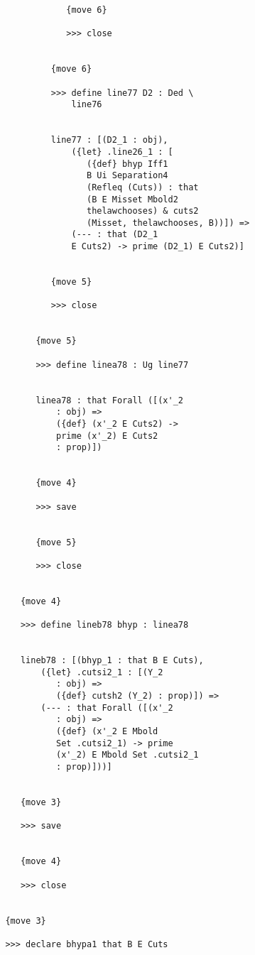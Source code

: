 \documentclass[12pt]{article}
\begin{document}
\begin{verbatim}
                     {move 6}

                     >>> close


                  {move 6}

                  >>> define line77 D2 : Ded \
                      line76


                  line77 : [(D2_1 : obj), 
                      ({let} .line26_1 : [
                         ({def} bhyp Iff1 
                         B Ui Separation4 
                         (Refleq (Cuts)) : that 
                         (B E Misset Mbold2 
                         thelawchooses) & cuts2 
                         (Misset, thelawchooses, B))]) => 
                      (--- : that (D2_1 
                      E Cuts2) -> prime (D2_1) E Cuts2)]


                  {move 5}

                  >>> close


               {move 5}

               >>> define linea78 : Ug line77


               linea78 : that Forall ([(x'_2 
                   : obj) => 
                   ({def} (x'_2 E Cuts2) -> 
                   prime (x'_2) E Cuts2 
                   : prop)])


               {move 4}

               >>> save


               {move 5}

               >>> close


            {move 4}

            >>> define lineb78 bhyp : linea78


            lineb78 : [(bhyp_1 : that B E Cuts), 
                ({let} .cutsi2_1 : [(Y_2 
                   : obj) => 
                   ({def} cutsh2 (Y_2) : prop)]) => 
                (--- : that Forall ([(x'_2 
                   : obj) => 
                   ({def} (x'_2 E Mbold 
                   Set .cutsi2_1) -> prime 
                   (x'_2) E Mbold Set .cutsi2_1 
                   : prop)]))]


            {move 3}

            >>> save


            {move 4}

            >>> close


         {move 3}

         >>> declare bhypa1 that B E Cuts



\end{verbatim}
\end{document}
